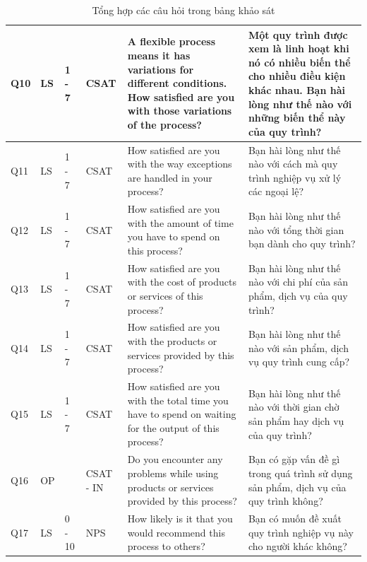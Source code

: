 \begin{center}
\begin{table}
    \begin{tabular}{|p{0.8cm} |p{1.5cm} |p{1cm}| p{0.8cm} | p{5cm} | p{5cm} |}
        \hline
            Q10 & LS & 1 - 7 & CSAT & A flexible process means it has variations for different conditions. How satisfied are you with those variations of the process? & Một quy trình được xem là linh hoạt khi nó có nhiều biến thể cho nhiều điều kiện khác nhau. Bạn hài lòng như thế nào với những biến thể này của quy trình? \\
        \hline
            Q11 & LS & 1 - 7 & CSAT & How satisfied are you with the way exceptions are handled in your process? & Bạn hài lòng như thế nào với cách mà quy trình nghiệp vụ xử lý các ngoại lệ? \\
        \hline
            Q12 & LS & 1 - 7 & CSAT & How satisfied are you with the amount of time you have to spend on this process? & Bạn hài lòng như thế nào với tổng thời gian bạn dành cho quy trình? \\
        \hline
            Q13 & LS & 1 - 7 & CSAT & How satisfied are you with the cost of products or services of this process? & Bạn hài lòng như thế nào với chi phí của sản phẩm, dịch vụ của quy trình? \\
        \hline
            Q14 & LS & 1 - 7 & CSAT & How satisfied are you with the products or services provided by this process? & Bạn hài lòng như thế nào với sản phẩm, dịch vụ quy trình cung cấp? \\
        \hline
            Q15 & LS & 1 - 7 & CSAT & How satisfied are you with the total time you have to spend on waiting for the output of this process? & Bạn hài lòng như thế nào với thời gian chờ sản phẩm hay dịch vụ của quy trình? \\
        \hline
            Q16 & OP &  & CSAT - IN & Do you encounter any problems while using products or services provided by this process? & Bạn có gặp vấn đề gì trong quá trình sử dụng sản phẩm, dịch vụ của quy trình không? \\
        \hline
            Q17 & LS & 0 - 10 & NPS & How likely is it that you would recommend this process to others? & Bạn có muốn đề xuất quy trình nghiệp vụ này cho người khác không? \\ [1ex]
        \hline
    \end{tabular}
    \caption{Tổng hợp các câu hỏi trong bảng khảo sát}
\end{table}
\end{center}

